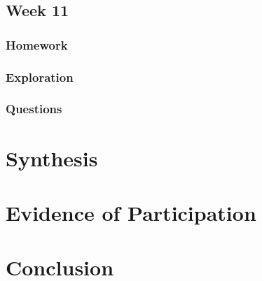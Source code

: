 \documentclass{article}
\theoremstyle{theorem}
\theoremstyle{definition}
\theoremstyle{remark}
\begin{document}
\subsection{Week 11}
\subsubsection{Homework}
\subsubsection{Exploration}
\subsubsection{Questions}

\section{Synthesis}

\section{Evidence of Participation}

\section{Conclusion}\label{conclusion}

\begin{thebibliography}{9}
\end{thebibliography}
\end{document}

